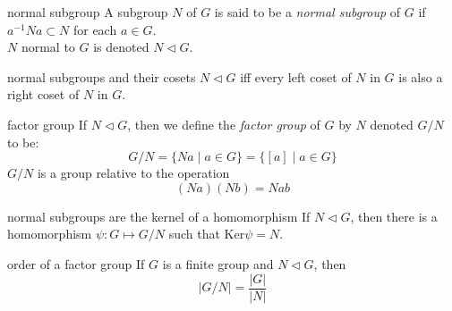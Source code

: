 \documentclass[avery5371,grid]{flashcards}
\begin{document}
\begin{flashcard}[Definition]{normal subgroup}
A subgroup $N$ of $G$ is said to be a \textit{normal subgroup}
of $G$ if $a^{-1}Na \subset N$ for each $a \in G$.
\medskip
\\
$N$ normal to $G$ is denoted $N \lhd G$.
\end{flashcard}

\begin{flashcard}[Theorem]{normal subgroups and their cosets}
$N \lhd G$ iff every left coset of $N$ in $G$ is also a right
coset of $N$ in $G$.
\end{flashcard}

\begin{flashcard}{factor group}
If $N \lhd G$, then we define the \textit{factor group}
of $G$ by $N$ denoted $G/N$ to be:
\begin{equation*}
G/N = \lbrace Na \mid a \in G \rbrace = 
\lbrace [a] \mid a \in G \rbrace
\end{equation*}
\medskip
$G/N$ is a group relative to the operation
\begin{equation*}
(Na)(Nb) = Nab
\end{equation*}
\end{flashcard}

\begin{flashcard}[Theorem]{normal subgroups are the kernel of a homomorphism}
If $N \lhd G$, then there is a homomorphism $\psi : G \mapsto G/N$
such that $\textrm{Ker} \psi = N$.
\end{flashcard}

\begin{flashcard}[Theorem]{order of a factor group}
If $G$ is a finite group and $N \lhd G$, then
\begin{equation*}
\left| G/N \right| = \frac{\left| G \right|}{\left| N \right|}
\end{equation*}
\end{flashcard}
\end{document}
